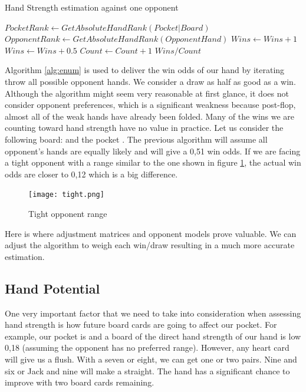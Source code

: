 \begin{Algorithmus}[H]
    \caption{Hand Strength estimation against one opponent}
    \label{alg:enum}
    \begin{algorithmic}
        \State $PocketRank \gets GetAbsoluteHandRank(Pocket | Board)$
        \State $OpponentRank \gets GetAbsoluteHandRank(OpponentHand)$
        \State $Wins \gets Wins + 1$
        \EndIf
        \State $Wins \gets Wins + 0.5$
        \EndIf
        \State $Count \gets Count + 1$
        \EndFor
        \State \Return $Wins / Count$
        \EndProcedure
    \end{algorithmic}
\end{Algorithmus}

Algorithm \ref{alg:enum} is used to deliver the win odds of our hand by iterating throw all possible opponent hands. We consider a draw as half as good as a win. Although the algorithm might seem very reasonable at first glance, it does not consider opponent preferences, which is a significant weakness because post-flop, almost all of the weak hands have already been folded. Many of the wins we are counting toward hand strength have no value in practice. Let us consider the following board:  and the pocket . The previous algorithm will assume all opponent's hands are equally likely and will give a 0,51 win odds. If we are facing a tight opponent with a range similar to the one shown in figure \ref{fig:tight}, the actual win odds are closer to 0,12 which is a big difference.

\begin{figure}[h]
    \centering
    \texttt{[image: tight.png]}
    \caption{Tight opponent range}
    \label{fig:tight}
\end{figure}

Here is where adjustment matrices and opponent models prove valuable. We can adjust the algorithm to weigh each win/draw resulting in a much more accurate estimation.

\subsection{Hand Potential}

One very important factor that we need to take into consideration when assessing hand strength is how future board cards are going to affect our pocket. For example, our pocket is  and a board of  the direct hand strength of our hand is low 0,18 (assuming the opponent has no preferred range). However, any heart card will give us a flush. With a seven or eight, we can get one or two pairs. Nine and six or Jack and nine will make a straight. The hand has a significant chance to improve with two board cards remaining.

